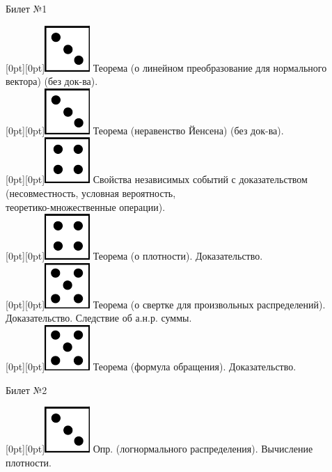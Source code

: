 \documentclass[10pt]{article}
\begin{document}
 
\begin{center} {\Large Билет №1} \end{center} 

\raisebox{-1pt}[0pt][0pt]{\includegraphics[width=0.02\linewidth]{3.png}} Теорема (о линейном преобразование для нормального вектора) (без док-ва). \\

\raisebox{-1pt}[0pt][0pt]{\includegraphics[width=0.02\linewidth]{3.png}} Теорема (неравенство Йенсена) (без док-ва). \\

\raisebox{-1pt}[0pt][0pt]{\includegraphics[width=0.02\linewidth]{4.png}} Свойства независимых событий с доказательством (несовместность, условная вероятность, \\ теоретико-множественные операции). \\

\raisebox{-1pt}[0pt][0pt]{\includegraphics[width=0.02\linewidth]{4.png}} Теорема (о плотности). Доказательство. \\

\raisebox{-1pt}[0pt][0pt]{\includegraphics[width=0.02\linewidth]{5.png}} Теорема (о свертке для произвольных распределений). Доказательство. Следствие об а.н.р. суммы. \\ 

\raisebox{-1pt}[0pt][0pt]{\includegraphics[width=0.02\linewidth]{5.png}} Теорема (формула обращения). Доказательство. \\

\begin{center} {\Large Билет №2} \end{center} 

\raisebox{-1pt}[0pt][0pt]{\includegraphics[width=0.02\linewidth]{3.png}} Опр. (логнормального распределения). Вычисление плотности. \\
\end{document}
